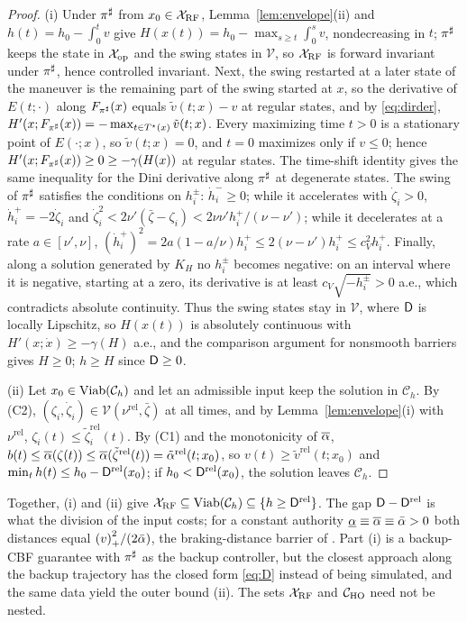 \begin{proof}
(i) Under $\pi^{\sharp}$ from $x_0\in\mathcal{X}_{\mathrm{RF}}$, Lemma~\ref{lem:envelope}(ii) and $h(t)=h_0-\int_0^tv$ give $H(x(t))=h_0-\max_{s\ge t}\int_0^s v$, nondecreasing in $t$; $\pi^{\sharp}$ keeps the state in $\mathcal{X}_{\mathrm{op}}$ and the swing states in $\mathcal{V}$, so $\mathcal{X}_{\mathrm{RF}}$ is forward invariant under $\pi^{\sharp}$, hence controlled invariant. Next, the swing restarted at a later state of the maneuver is the remaining part of the swing started at $x$, so the derivative of $E(t;\cdot)$ along $F_{\pi^{\sharp}}(x)$ equals $\tilde v(t;x)-v$ at regular states, and by \eqref{eq:dirder}, $H'(x;F_{\pi^{\sharp}}(x))=-\max_{t\in T^\star(x)}\tilde v(t;x)$. Every maximizing time $t>0$ is a stationary point of $E(\cdot;x)$, so $\tilde v(t;x)=0$, and $t=0$ maximizes only if $v\le0$; hence $H'(x;F_{\pi^{\sharp}}(x))\ge0\ge-\gamma(H(x))$ at regular states. The time-shift identity gives the same inequality for the Dini derivative along $\pi^{\sharp}$ at degenerate states. The swing of $\pi^{\sharp}$ satisfies the conditions on $h^{\pm}_i$: $\dot h^{-}_i\ge0$; while it accelerates with $\dot\zeta_i>0$, $\dot h^{+}_i=-2\dot\zeta_i$ and $\dot\zeta_i^2<2\nu'(\bar\zeta-\zeta_i)<2\nu\nu'h^{+}_i/(\nu-\nu')$; while it decelerates at a rate $a\in[\nu',\nu]$, $(\dot h^{+}_i)^2=2a(1-a/\nu)h^{+}_i\le2(\nu-\nu')h^{+}_i\le c_V^2h^{+}_i$. Finally, along a solution generated by $K_H$ no $h^{\pm}_i$ becomes negative: on an interval where it is negative, starting at a zero, its derivative is at least $c_V\sqrt{-h^{\pm}_i}>0$ a.e., which contradicts absolute continuity. Thus the swing states stay in $\mathcal{V}$, where $\mathsf{D}$ is locally Lipschitz, so $H(x(t))$ is absolutely continuous with $H'(x;\dot x)\ge-\gamma(H)$ a.e., and the comparison argument for nonsmooth barriers \cite{glotfelter2017nonsmooth} gives $H\ge0$; $h\ge H$ since $\mathsf{D}\ge0$.

(ii) Let $x_0\in\operatorname{Viab}(\mathcal{C}_h)$ and let an admissible input keep the solution in $\mathcal{C}_h$. By (C2), $(\zeta_i,\dot\zeta_i)\in\mathcal{V}(\nu^{\mathrm{rel}},\bar\zeta)$ at all times, and by Lemma~\ref{lem:envelope}(i) with $\nu^{\mathrm{rel}}$, $\zeta_i(t)\le\tilde\zeta_i^{\mathrm{rel}}(t)$. By (C1) and the monotonicity of $\overline{\alpha}$, $b(t)\le\overline{\alpha}(\zeta(t))\le\overline{\alpha}(\tilde\zeta^{\mathrm{rel}}(t))=\tilde\alpha^{\mathrm{rel}}(t;x_0)$, so $v(t)\ge\tilde v^{\mathrm{rel}}(t;x_0)$ and $\min_th(t)\le h_0-\mathsf{D}^{\mathrm{rel}}(x_0)$; if $h_0<\mathsf{D}^{\mathrm{rel}}(x_0)$, the solution leaves $\mathcal{C}_h$.
\end{proof}

Together, (i) and (ii) give $\mathcal{X}_{\mathrm{RF}}\subseteq\operatorname{Viab}(\mathcal{C}_h)\subseteq\{h\ge\mathsf{D}^{\mathrm{rel}}\}$. The gap $\mathsf{D}-\mathsf{D}^{\mathrm{rel}}$ is what the division of the input costs; for a constant authority $\underline{\alpha}\equiv\overline{\alpha}\equiv\bar\alpha>0$ both distances equal ${(v)}_{+}^2/(2\bar\alpha)$, the braking-distance barrier of \cite{ames2014control}. Part (i) is a backup-CBF guarantee \cite{gurriet2020scalable,chen2021backup} with $\pi^{\sharp}$ as the backup controller, but the closest approach along the backup trajectory has the closed form \eqref{eq:D} instead of being simulated, and the same data yield the outer bound (ii). The sets $\mathcal{X}_{\mathrm{RF}}$ and $\mathcal{C}_{\mathrm{HO}}$ need not be nested.

